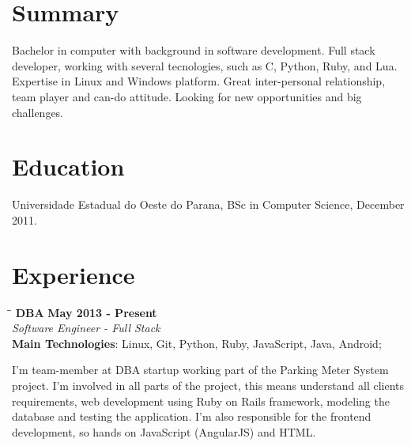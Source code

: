 \documentclass[margin]{res}
\begin{document}
  

\address{Brazil, BR \\ cadicallegari@gmail.com \\ Phone: +55 (48) 9826 4067}
                           
                        
\begin{resume}                        
 
\section{Summary}       Bachelor in computer with background in software development. Full stack developer, working with
                        several tecnologies, such as C, Python, Ruby, and Lua. Expertise in Linux and Windows platform.
                        Great inter-personal relationship, team player and can-do attitude. Looking for new opportunities
                        and big challenges.                        
 
\section{Education} Universidade Estadual do Oeste do Parana, BSc in Computer Science, December 2011.
  
\section{Experience}

\vspace{-0.1in}
   \begin{tabbing}
   \hspace{2.3in}\= \hspace{1.7in}\= \kill %
    \textbf{DBA}    \>\>\textbf{May 2013 - Present}\\
    \textit{Software Engineer - Full Stack}\\        
    \textbf{Main Technologies}: Linux, Git, Python, Ruby, JavaScript, Java, Android;
   \end{tabbing}\vspace{-20pt}      %
    \vspace{2mm}
I'm team-member at DBA startup working part of the Parking Meter System project. I'm involved in all parts of the project, this means understand all clients requirements, web development using Ruby on Rails framework, modeling the database and testing the application. I'm also responsible for the frontend development, so hands on JavaScript (AngularJS) and HTML.


\end{resume}
\end{document}
